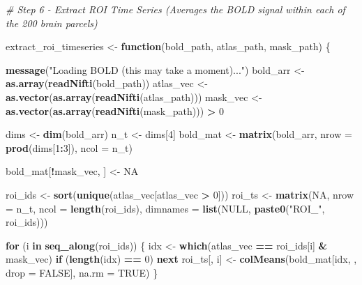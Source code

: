 \documentclass[
]{article}
\newenvironment{Shaded}{\begin{snugshade}}{\end{snugshade}}
\newcommand{\AttributeTok}[1]{\textcolor[rgb]{0.13,0.29,0.53}{#1}}
\newcommand{\CommentTok}[1]{\textcolor[rgb]{0.56,0.35,0.01}{\textit{#1}}}
\newcommand{\ConstantTok}[1]{\textcolor[rgb]{0.56,0.35,0.01}{#1}}
\newcommand{\ControlFlowTok}[1]{\textcolor[rgb]{0.13,0.29,0.53}{\textbf{#1}}}
\newcommand{\DecValTok}[1]{\textcolor[rgb]{0.00,0.00,0.81}{#1}}
\newcommand{\FunctionTok}[1]{\textcolor[rgb]{0.13,0.29,0.53}{\textbf{#1}}}
\newcommand{\NormalTok}[1]{#1}
\newcommand{\OtherTok}[1]{\textcolor[rgb]{0.56,0.35,0.01}{#1}}
\newcommand{\SpecialCharTok}[1]{\textcolor[rgb]{0.81,0.36,0.00}{\textbf{#1}}}
\newcommand{\StringTok}[1]{\textcolor[rgb]{0.31,0.60,0.02}{#1}}
\begin{document}
\begin{Shaded}
\begin{Highlighting}[]
\CommentTok{\# Step 6 {-} Extract ROI Time Series (Averages the BOLD signal within each of the 200 brain parcels)}

\NormalTok{extract\_roi\_timeseries }\OtherTok{\textless{}{-}} \ControlFlowTok{function}\NormalTok{(bold\_path, atlas\_path, mask\_path) \{}

  \FunctionTok{message}\NormalTok{(}\StringTok{"Loading BOLD (this may take a moment)..."}\NormalTok{)}
\NormalTok{  bold\_arr  }\OtherTok{\textless{}{-}} \FunctionTok{as.array}\NormalTok{(}\FunctionTok{readNifti}\NormalTok{(bold\_path))}
\NormalTok{  atlas\_vec }\OtherTok{\textless{}{-}} \FunctionTok{as.vector}\NormalTok{(}\FunctionTok{as.array}\NormalTok{(}\FunctionTok{readNifti}\NormalTok{(atlas\_path)))}
\NormalTok{  mask\_vec  }\OtherTok{\textless{}{-}} \FunctionTok{as.vector}\NormalTok{(}\FunctionTok{as.array}\NormalTok{(}\FunctionTok{readNifti}\NormalTok{(mask\_path))) }\SpecialCharTok{\textgreater{}} \DecValTok{0}

\NormalTok{  dims     }\OtherTok{\textless{}{-}} \FunctionTok{dim}\NormalTok{(bold\_arr)}
\NormalTok{  n\_t      }\OtherTok{\textless{}{-}}\NormalTok{ dims[}\DecValTok{4}\NormalTok{]}
\NormalTok{  bold\_mat }\OtherTok{\textless{}{-}} \FunctionTok{matrix}\NormalTok{(bold\_arr, }\AttributeTok{nrow =} \FunctionTok{prod}\NormalTok{(dims[}\DecValTok{1}\SpecialCharTok{:}\DecValTok{3}\NormalTok{]), }\AttributeTok{ncol =}\NormalTok{ n\_t)}

\NormalTok{  bold\_mat[}\SpecialCharTok{!}\NormalTok{mask\_vec, ] }\OtherTok{\textless{}{-}} \ConstantTok{NA}

\NormalTok{  roi\_ids }\OtherTok{\textless{}{-}} \FunctionTok{sort}\NormalTok{(}\FunctionTok{unique}\NormalTok{(atlas\_vec[atlas\_vec }\SpecialCharTok{\textgreater{}} \DecValTok{0}\NormalTok{]))}
\NormalTok{  roi\_ts  }\OtherTok{\textless{}{-}} \FunctionTok{matrix}\NormalTok{(}\ConstantTok{NA}\NormalTok{, }\AttributeTok{nrow =}\NormalTok{ n\_t, }\AttributeTok{ncol =} \FunctionTok{length}\NormalTok{(roi\_ids),}
                    \AttributeTok{dimnames =} \FunctionTok{list}\NormalTok{(}\ConstantTok{NULL}\NormalTok{, }\FunctionTok{paste0}\NormalTok{(}\StringTok{"ROI\_"}\NormalTok{, roi\_ids)))}

  \ControlFlowTok{for}\NormalTok{ (i }\ControlFlowTok{in} \FunctionTok{seq\_along}\NormalTok{(roi\_ids)) \{}
\NormalTok{    idx }\OtherTok{\textless{}{-}} \FunctionTok{which}\NormalTok{(atlas\_vec }\SpecialCharTok{==}\NormalTok{ roi\_ids[i] }\SpecialCharTok{\&}\NormalTok{ mask\_vec)}
    \ControlFlowTok{if}\NormalTok{ (}\FunctionTok{length}\NormalTok{(idx) }\SpecialCharTok{==} \DecValTok{0}\NormalTok{) }\ControlFlowTok{next}
\NormalTok{    roi\_ts[, i] }\OtherTok{\textless{}{-}} \FunctionTok{colMeans}\NormalTok{(bold\_mat[idx, , }\AttributeTok{drop =} \ConstantTok{FALSE}\NormalTok{], }\AttributeTok{na.rm =} \ConstantTok{TRUE}\NormalTok{)}
\NormalTok{  \}}


\end{Highlighting}
\end{Shaded}
\end{document}
